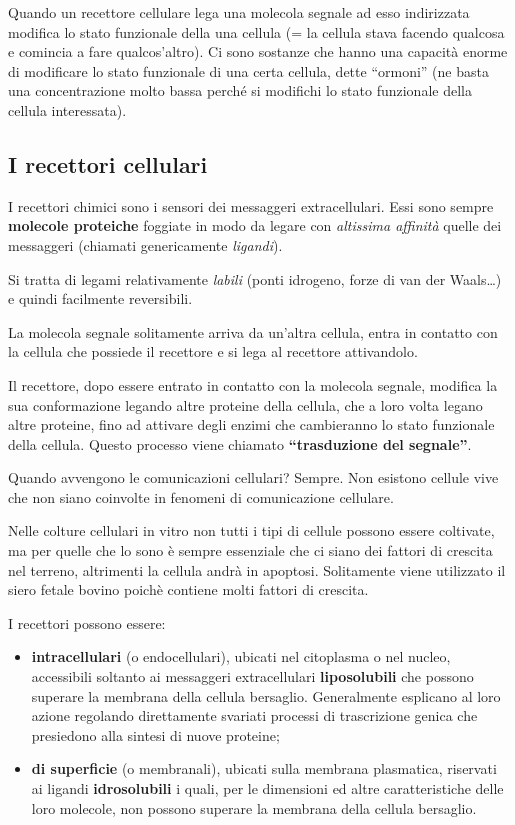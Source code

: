 \documentclass[]{article}
\begin{document}
Quando un recettore cellulare lega una molecola segnale ad esso
indirizzata modifica lo stato funzionale della una cellula (= la cellula
stava facendo qualcosa e comincia a fare qualcos'altro). Ci sono
sostanze che hanno una capacità enorme di modificare lo stato funzionale
di una certa cellula, dette ``ormoni'' (ne basta una concentrazione
molto bassa perché si modifichi lo stato funzionale della cellula
interessata).

\subsection{I recettori cellulari}\label{i-recettori-cellulari}

I recettori chimici sono i sensori dei messaggeri extracellulari. Essi
sono sempre \textbf{molecole proteiche} foggiate in modo da legare con
\emph{altissima affinità} quelle dei messaggeri (chiamati genericamente
\emph{ligandi}).

Si tratta di legami relativamente \emph{labili} (ponti idrogeno, forze
di van der Waals\ldots{}) e quindi facilmente reversibili.

La molecola segnale solitamente arriva da un'altra cellula, entra in
contatto con la cellula che possiede il recettore e si lega al recettore
attivandolo.

Il recettore, dopo essere entrato in contatto con la molecola segnale,
modifica la sua conformazione legando altre proteine della cellula, che
a loro volta legano altre proteine, fino ad attivare degli enzimi che
cambieranno lo stato funzionale della cellula. Questo processo viene
chiamato \textbf{``trasduzione del segnale''}.

Quando avvengono le comunicazioni cellulari? Sempre. Non esistono
cellule vive che non siano coinvolte in fenomeni di comunicazione
cellulare.

Nelle colture cellulari in vitro non tutti i tipi di cellule possono
essere coltivate, ma per quelle che lo sono è sempre essenziale che ci
siano dei fattori di crescita nel terreno, altrimenti la cellula andrà
in apoptosi. Solitamente viene utilizzato il siero fetale bovino poichè
contiene molti fattori di crescita.

I recettori possono essere:

\begin{itemize}
\itemsep1pt\parskip0pt
\item
  \textbf{intracellulari} (o endocellulari), ubicati nel citoplasma o
  nel nucleo, accessibili soltanto ai messaggeri extracellulari
  \textbf{liposolubili} che possono superare la membrana della cellula
  bersaglio. Generalmente esplicano al loro azione regolando
  direttamente svariati processi di trascrizione genica che presiedono
  alla sintesi di nuove proteine;
\item
  \textbf{di superficie} (o membranali), ubicati sulla membrana
  plasmatica, riservati ai ligandi \textbf{idrosolubili} i quali, per le
  dimensioni ed altre caratteristiche delle loro molecole, non possono
  superare la membrana della cellula bersaglio.
\end{itemize}
\end{document}
